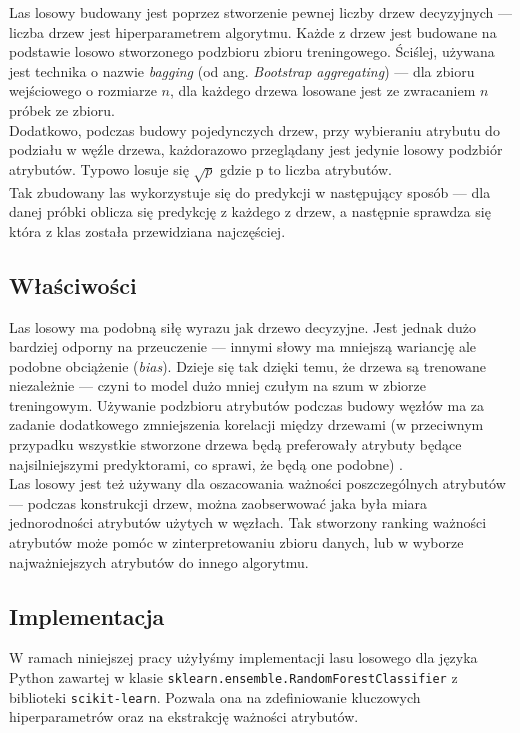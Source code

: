 Las losowy budowany jest poprzez stworzenie pewnej liczby drzew decyzyjnych --- liczba drzew jest hiperparametrem algorytmu. Każde z drzew jest budowane na podstawie losowo stworzonego podzbioru zbioru treningowego. Ściślej, używana jest technika o nazwie \textit{bagging} (od ang. \textit{Bootstrap aggregating}) \cite{breiman1996bagging} --- dla zbioru wejściowego o rozmiarze $n$, dla każdego drzewa losowane jest ze zwracaniem $n$ próbek ze zbioru.
\\Dodatkowo, podczas budowy pojedynczych drzew, przy wybieraniu atrybutu do podziału w węźle drzewa, każdorazowo przeglądany jest jedynie losowy podzbiór atrybutów. Typowo losuje się $\sqrt{p}$ gdzie p to liczba atrybutów.
\\Tak zbudowany las wykorzystuje się do predykcji w następujący sposób --- dla danej próbki oblicza się predykcję z każdego z drzew, a następnie sprawdza się która z klas została przewidziana najczęściej.

\subsection{Właściwości}

Las losowy ma podobną siłę wyrazu jak drzewo decyzyjne. Jest jednak dużo bardziej odporny na przeuczenie --- innymi słowy ma mniejszą wariancję ale podobne obciążenie (\textit{bias}). Dzieje się tak dzięki temu, że drzewa są trenowane niezależnie --- czyni to model dużo mniej czułym na szum w zbiorze treningowym. Używanie podzbioru atrybutów podczas budowy węzłów ma za zadanie dodatkowego zmniejszenia korelacji między drzewami (w przeciwnym przypadku wszystkie stworzone drzewa będą preferowały atrybuty będące najsilniejszymi predyktorami, co sprawi, że będą one podobne) \cite{ho2002data}.
\\Las losowy jest też używany dla oszacowania ważności poszczególnych atrybutów --- podczas konstrukcji drzew, można zaobserwować jaka była miara jednorodności atrybutów użytych w węzłach. Tak stworzony ranking ważności atrybutów może pomóc w zinterpretowaniu zbioru danych, lub w wyborze najważniejszych atrybutów do innego algorytmu.

\subsection{Implementacja}

W ramach niniejszej pracy użyłyśmy implementacji lasu losowego dla języka Python zawartej w klasie \verb_sklearn.ensemble.RandomForestClassifier_ z biblioteki \verb_scikit-learn_. Pozwala ona na zdefiniowanie kluczowych hiperparametrów oraz na ekstrakcję ważności atrybutów.



